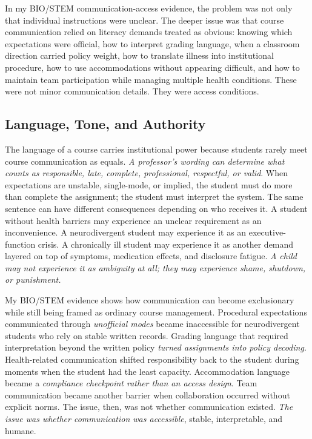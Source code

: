 In my BIO/STEM communication-access evidence, the problem was not only that individual instructions were unclear. The deeper issue was that course communication relied on literacy demands treated as obvious: knowing which expectations were official, how to interpret grading language, when a classroom direction carried policy weight, how to translate illness into institutional procedure, how to use accommodations without appearing difficult, and how to maintain team participation while managing multiple health conditions. These were not minor communication details. They were access conditions.

\subsection*{Language, Tone, and Authority}

The language of a course carries institutional power because students rarely meet course communication as equals. \textit{A professor's wording can determine what counts as responsible, late, complete, professional, respectful, or valid}. When expectations are unstable, single-mode, or implied, the student must do more than complete the assignment; the student must interpret the system. The same sentence can have different consequences depending on who receives it. A student without health barriers may experience an unclear requirement as an inconvenience. A neurodivergent student may experience it as an executive-function crisis. A chronically ill student may experience it as another demand layered on top of symptoms, medication effects, and disclosure fatigue. \textit{A child may not experience it as ambiguity at all; they may experience shame, shutdown, or punishment.}

My BIO/STEM evidence shows how communication can become exclusionary while still being framed as ordinary course management. Procedural expectations communicated through \textit{unofficial modes} became inaccessible for neurodivergent students who rely on stable written records. Grading language that required interpretation beyond the written policy \textit{turned assignments into policy decoding}. Health-related communication shifted responsibility back to the student during moments when the student had the least capacity. Accommodation language became a \textit{compliance checkpoint rather than an access design}. Team communication became another barrier when collaboration occurred without explicit norms. The issue, then, was not whether communication existed. \textit{The issue was whether communication was accessible}, stable, interpretable, and humane.

